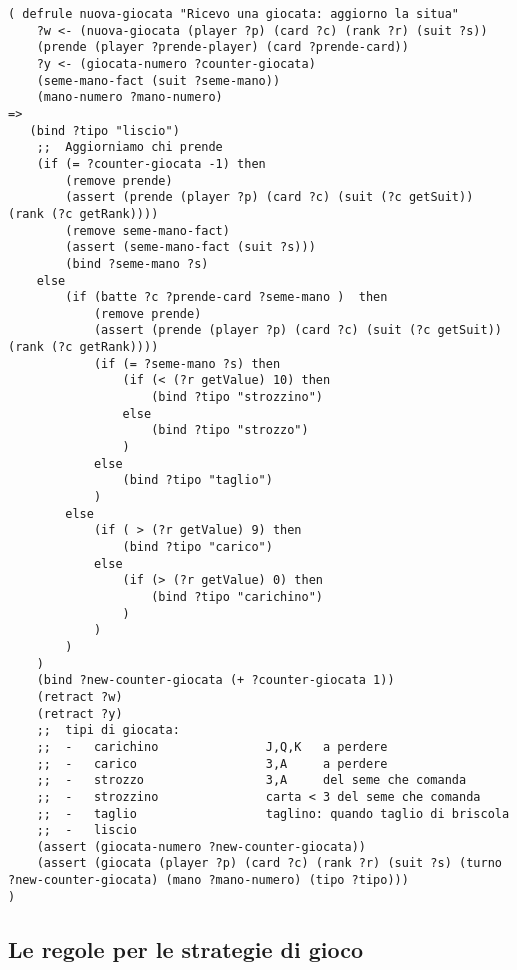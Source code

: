 \begin{lstlisting}[caption={Regola che analizza una nuova giocata ricevuta, la classifica e aggiorna alcuni fatti temporanei},label=nuovagiocata]
   ( defrule nuova-giocata "Ricevo una giocata: aggiorno la situa"
    ?w <- (nuova-giocata (player ?p) (card ?c) (rank ?r) (suit ?s))
    (prende (player ?prende-player) (card ?prende-card))
    ?y <- (giocata-numero ?counter-giocata)
    (seme-mano-fact (suit ?seme-mano))
    (mano-numero ?mano-numero)
=>
   (bind ?tipo "liscio") 
    ;;  Aggiorniamo chi prende
    (if (= ?counter-giocata -1) then
        (remove prende)
        (assert (prende (player ?p) (card ?c) (suit (?c getSuit)) (rank (?c getRank))))
        (remove seme-mano-fact)
        (assert (seme-mano-fact (suit ?s)))
        (bind ?seme-mano ?s)
    else
        (if (batte ?c ?prende-card ?seme-mano )  then
            (remove prende)
            (assert (prende (player ?p) (card ?c) (suit (?c getSuit)) (rank (?c getRank))))
            (if (= ?seme-mano ?s) then
                (if (< (?r getValue) 10) then
                    (bind ?tipo "strozzino")
                else
                    (bind ?tipo "strozzo")
                )
            else
                (bind ?tipo "taglio")
            )
        else
            (if ( > (?r getValue) 9) then
                (bind ?tipo "carico")
            else
                (if (> (?r getValue) 0) then
                    (bind ?tipo "carichino")
                )
            )
        )
    )
    (bind ?new-counter-giocata (+ ?counter-giocata 1))
    (retract ?w)
    (retract ?y)
    ;;  tipi di giocata:
    ;;  -   carichino               J,Q,K   a perdere
    ;;  -   carico                  3,A     a perdere
    ;;  -   strozzo                 3,A     del seme che comanda
    ;;  -   strozzino               carta < 3 del seme che comanda
    ;;  -   taglio                  taglino: quando taglio di briscola
    ;;  -   liscio
    (assert (giocata-numero ?new-counter-giocata))
    (assert (giocata (player ?p) (card ?c) (rank ?r) (suit ?s) (turno ?new-counter-giocata) (mano ?mano-numero) (tipo ?tipo)))
)
\end{lstlisting} 


\subsection{Le regole per le strategie di gioco}

